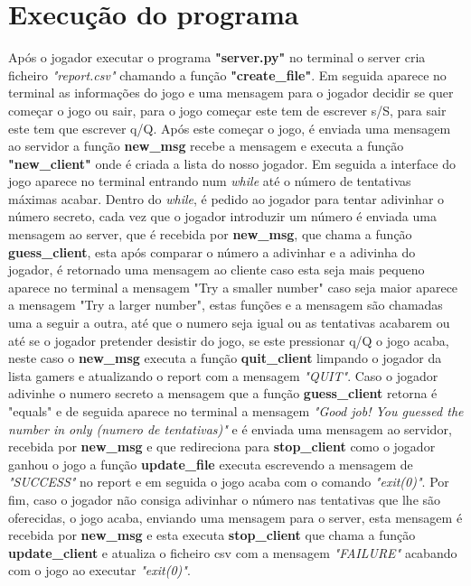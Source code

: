 \documentclass{report}
\begin{document}
\section{Execução do programa}
Após o jogador executar o programa \textbf{"server.py"} no terminal o server cria ficheiro \textit{"report.csv"} chamando a função \textbf{"create\_file"}. Em seguida aparece no terminal as informações do jogo e uma mensagem para o jogador decidir se quer começar o jogo ou sair, para o jogo começar este tem de escrever s/S, para sair este tem que escrever q/Q. Após este começar o jogo, é enviada uma mensagem ao servidor a função \textbf{new\_msg} recebe a mensagem e executa a função \textbf{"new\_client"} onde é criada a lista do nosso jogador. Em seguida a interface do jogo aparece no terminal entrando num \textit{while} até o número de tentativas máximas acabar. Dentro do \textit{while}, é pedido ao jogador para tentar adivinhar o número secreto, cada vez que o jogador introduzir um número é enviada uma  mensagem ao server, que é recebida por \textbf{new\_msg}, que chama a função \textbf{guess\_client}, esta após comparar o número a adivinhar e a adivinha do jogador, é retornado uma mensagem ao cliente caso esta seja mais pequeno aparece no terminal a mensagem "Try a smaller number" caso seja maior aparece a mensagem "Try a larger number", estas funções e a mensagem são chamadas uma a seguir a outra, até que o numero seja igual ou as tentativas acabarem ou até se o jogador pretender desistir do jogo, se este pressionar q/Q o jogo acaba, neste caso o \textbf{new\_msg} executa a função \textbf{quit\_client} limpando o jogador da lista gamers e atualizando o report com a mensagem \textit{"QUIT"}. Caso o jogador adivinhe o numero secreto a mensagem que a função \textbf{guess\_client} retorna é "equals" e de seguida aparece no terminal a mensagem \textit{"Good job! You guessed the number in only (numero de tentativas)"} e é enviada uma mensagem ao servidor, recebida por \textbf{new\_msg} e que redireciona para \textbf{stop\_client} como o jogador ganhou o jogo a função \textbf{update\_file} executa escrevendo a mensagem de \emph{"SUCCESS"} no report e em seguida o jogo acaba com o comando \textit{"exit(0)"}. Por fim, caso o jogador não consiga adivinhar o número nas tentativas que lhe são oferecidas, o jogo acaba, enviando uma mensagem para o server, esta mensagem é recebida por \textbf{new\_msg} e esta executa \textbf{stop\_client} que chama a função \textbf{update\_client} e atualiza o ficheiro csv com a mensagem \emph{"FAILURE"} acabando com o jogo ao executar \textit{"exit(0)"}.
\end{document}
